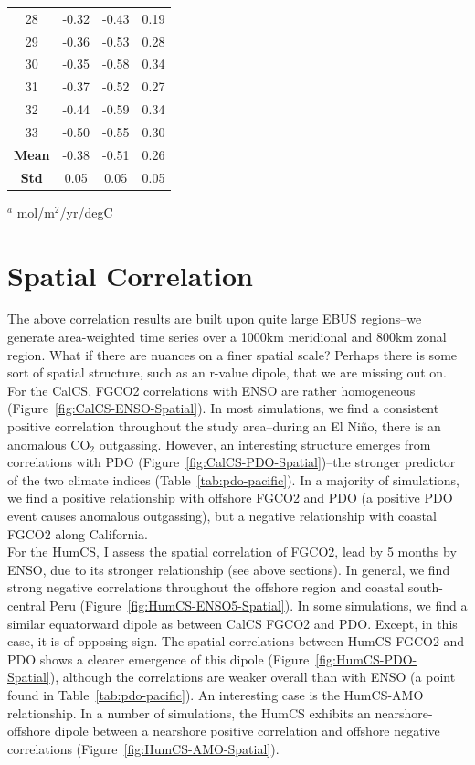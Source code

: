 \documentclass[12pt]{article}
\begin{document}
\begin{table}
\begin{tabular}{c c c c}
	28 &  -0.32 &    -0.43 &       0.19 \\
	29 &  -0.36 &    -0.53 &       0.28 \\
	30 &  -0.35 &    -0.58 &       0.34 \\
	31 &  -0.37 &    -0.52 &       0.27 \\
	32 &  -0.44 &    -0.59 &       0.34 \\
	33 &  -0.50 &    -0.55 &       0.30 \\
	\bottomrule
	\textbf{Mean} & -0.38 & -0.51 & 0.26  \\
	\textbf{Std} & 0.05 & 0.05 & 0.05  \\
\end{tabular}
\begin{tablenotes}
	\centering
	\item $^{a}$ mol/m$^{2}$/yr/degC
\end{tablenotes}
\label{tab:HumCS-ENSO-5lag}
\end{table}

\clearpage
\section{Spatial Correlation}
The above correlation results are built upon quite large EBUS regions--we generate area-weighted time series over a 1000km meridional and 800km zonal region. What if there are nuances on a finer spatial scale? Perhaps there is some sort of spatial structure, such as an r-value dipole, that we are missing out on. \\

For the CalCS, FGCO2 correlations with ENSO are rather homogeneous (Figure~\ref{fig:CalCS-ENSO-Spatial}). In most simulations, we find a consistent positive correlation throughout the study area--during an El Ni\~no, there is an anomalous CO$_{2}$ outgassing. However, an interesting structure emerges from correlations with PDO (Figure~\ref{fig:CalCS-PDO-Spatial})--the stronger predictor of the two climate indices (Table~\ref{tab:pdo-pacific}). In a majority of simulations, we find a positive relationship with offshore FGCO2 and PDO (a positive PDO event causes anomalous outgassing), but a negative relationship with coastal FGCO2 along California. \\

For the HumCS, I assess the spatial correlation of FGCO2, lead by 5 months by ENSO, due to its stronger relationship (see above sections). In general, we find strong negative correlations throughout the offshore region and coastal south-central Peru (Figure~\ref{fig:HumCS-ENSO5-Spatial}). In some simulations, we find a similar equatorward dipole as between CalCS FGCO2 and PDO. Except, in this case, it is of opposing sign. The spatial correlations between HumCS FGCO2 and PDO shows a clearer emergence of this dipole (Figure~\ref{fig:HumCS-PDO-Spatial}), although the correlations are weaker overall than with ENSO (a point found in Table~\ref{tab:pdo-pacific}). An interesting case is the HumCS-AMO relationship. In a number of simulations, the HumCS exhibits an nearshore-offshore dipole between a nearshore positive correlation and offshore negative correlations (Figure~\ref{fig:HumCS-AMO-Spatial}). \\
\end{document}

